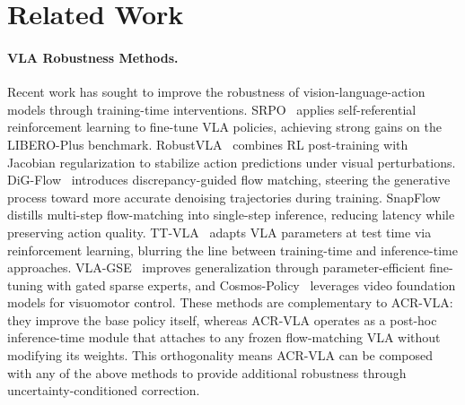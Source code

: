 \section{Related Work}
\label{sec:related}

\paragraph{VLA Robustness Methods.}
Recent work has sought to improve the robustness of vision-language-action models through training-time interventions.
SRPO~\cite{srpo2025} applies self-referential reinforcement learning to fine-tune VLA policies, achieving strong gains on the LIBERO-Plus benchmark.
RobustVLA~\cite{robustvla2025} combines RL post-training with Jacobian regularization to stabilize action predictions under visual perturbations.
DiG-Flow~\cite{digflow2025} introduces discrepancy-guided flow matching, steering the generative process toward more accurate denoising trajectories during training.
SnapFlow~\cite{luan2026snapflow} distills multi-step flow-matching into single-step inference, reducing latency while preserving action quality.
TT-VLA~\cite{liu2026ttvla} adapts VLA parameters at test time via reinforcement learning, blurring the line between training-time and inference-time approaches.
VLA-GSE~\cite{vla_gse_2026} improves generalization through parameter-efficient fine-tuning with gated sparse experts, and Cosmos-Policy~\cite{cosmos_policy_2026} leverages video foundation models for visuomotor control.
These methods are complementary to ACR-VLA: they improve the base policy itself, whereas ACR-VLA operates as a post-hoc inference-time module that attaches to any frozen flow-matching VLA without modifying its weights.
This orthogonality means ACR-VLA can be composed with any of the above methods to provide additional robustness through uncertainty-conditioned correction.

